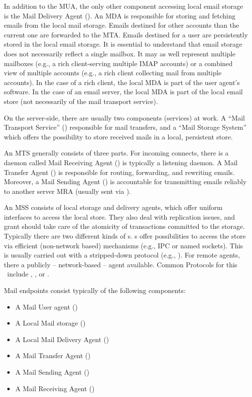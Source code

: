 In addition to the MUA, the only other component accessing local email storage is the Mail Delivery Agent (). An MDA is responsible for storing and fetching emails from the local mail storage. Emails destined for other accounts than the current one are forwarded to the MTA. Emails destined for a user are persistently stored in the local email storage. It is essential to understand that email storage does not necessarily reflect a single mailbox. It may as well represent multiple mailboxes (e.g., a rich client-serving multiple IMAP accounts) or a combined view of multiple accounts (e.g., a rich client collecting mail from multiple  accounts). In the case of a rich client, the local MDA is part of the user agent's software. In the case of an email server, the local MDA is part of the local email store (not necessarily of the mail transport service).

On the server-side, there are usually two components (services) at work. A ``Mail Transport Service'' () responsible for mail transfers, and a ``Mail Storage System'' which offers the possibility to store received mails in a local, persistent store.\par

An MTS generally consists of three parts. For incoming connects, there is a daemon called Mail Receiving Agent () is typically a  listening daemon. A Mail Transfer Agent () is responsible for routing, forwarding, and rewriting emails. Moreover, a Mail Sending Agent () is accountable for transmitting emails reliably to another server MRA (usually sent via ).\par

An MSS consists of local storage and delivery agents, which offer uniform interfaces to access the local store. They also deal with replication issues, and grant should take care of the atomicity of transactions committed to the storage. Typically there are two different kinds of s. s offer possibilities to access the store via efficient (non-network based) mechanisms (e.g., IPC or named sockets). This is usually carried out with a stripped-down protocol (e.g., ). For remote agents, there a publicly -- network-based -- agent available. Common Protocols for this \ include , , or .\par

Mail endpoints consist typically of the following components:
\begin{itemize}
	\item A Mail User agent ()
	\item A Local Mail storage ()
	\item A Local Mail Delivery Agent ()
	\item A Mail Transfer Agent ()
	\item A Mail Sending Agent ()
	\item A Mail Receiving Agent ()
\end{itemize}


